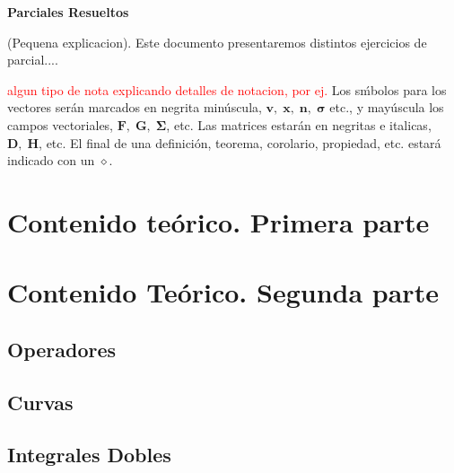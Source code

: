 \documentclass[10pt, a4paper]{report}
\theoremstyle{definition} %
\begin{document}
    \newpage

    \setcounter{page}{1}
    \begin{center}
        \textbf{ \noindent \textbf{Parciales Resueltos}}
    \end{center}
    \vspace{3cm}
      
    (Pequena explicacion).  Este documento presentaremos distintos ejercicios de parcial....
    \newpage

    \tableofcontents
        \setcounter{page}{1}
    \vfill
    \textcolor{red}{algun tipo de nota explicando detalles de notacion, por ej.} Los s\'mbolos para los vectores ser\'an marcados en negrita min\'uscula, $\mathbf{v},\;\mathbf{x},\;\mathbf{n},\;\boldsymbol{\sigma}$ etc., y may\'uscula los campos vectoriales, $\mathbf{F},\;\mathbf{G},\;\boldsymbol{\Sigma}$, etc. Las matrices estar\'an en negritas e italicas, $\boldsymbol{D},\;\boldsymbol{H}$, etc. El final de una definici\'on, teorema, corolario, propiedad, etc. estar\'a indicado con un $\diamond$.

    \chapter{Contenido teórico. Primera parte}

    \chapter{Contenido Teórico. Segunda parte}
        \section{Operadores}
            
        \section{Curvas}
            
        \section{Integrales Dobles} 
            
\end{document}

